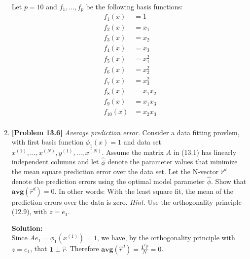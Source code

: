\begin{enumerate}[label=(\alph*)]
\begin{tcolorbox}
		      Let $p = 10$ and $f_1, \dots, f_p$ be the following basis functions:
		      $$ \begin{aligned}
				      f_1(x)    & = 1      \\
				      f_2(x)    & = x_1    \\
				      f_3(x)    & = x_2    \\
				      f_4(x)    & = x_3    \\
				      f_5(x)    & = x_1^2  \\
				      f_6(x)    & = x_2^2  \\
				      f_7(x)    & = x_3^2  \\
				      f_8(x)    & = x_1x_2 \\
				      f_9(x)    & = x_1x_3 \\
				      f_{10}(x) & = x_2x_3 \\
			      \end{aligned}
		      $$

	      \end{tcolorbox}
	\item \textbf{[Problem 13.6]} \textit{Average prediction error.} Consider a
	      data fitting provlem, with first basis function $\phi_1(x) = 1$ and data
	      set $x^{(1)}, \dots, x^{(N)}, y^{(1)}, \dots, x^{(N)}$. Assume the
	      matrix $A$ in (13.1) has linearly independent columns and let
	      $\hat{\phi}$ denote the parameter values that minimize the mean square
	      prediction error over the data set. Let the N-vector $\hat{r}^d$ denote
	      the prediction errors using the optimal model parameter $\hat{\phi}$.
	      Show that $\mathbf{avg}(\hat{r}^d) = 0$. In other words: With the least
	      square fit, the mean of the prediction errors over the data is zero.
	      \textit{Hint.} Use the orthogonality principle (12.9), with $z = e_1$.
	      \begin{tcolorbox}
		      \textbf{Solution:}\\
		      Since $Ae_1 = \phi_1(x^{(1)}) = 1$, we have, by the orthogonality
		      principle with $z = e_1$, that $\mathbf{1} \perp \hat{r}$.
		      Therefore $\mathbf{avg}(\hat{r}^d) = \frac{\mathbf{1}^T\hat{r}}{N}
			      = 0$.
	      \end{tcolorbox}
\end{enumerate}
